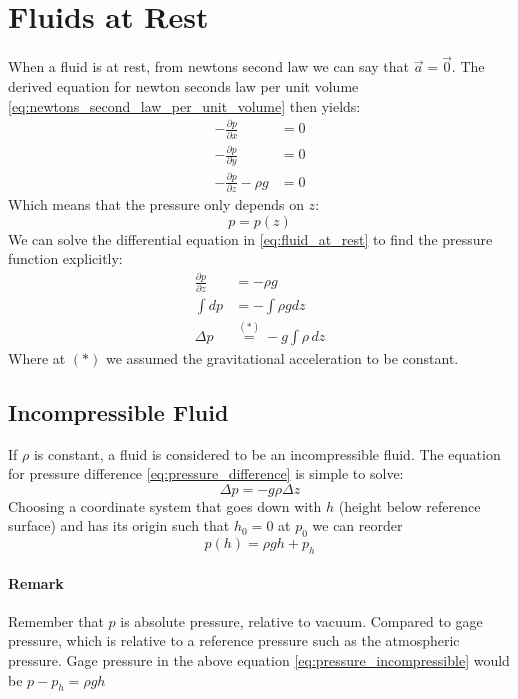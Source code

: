 \section{Fluids at Rest}
When a fluid is at rest, from newtons second law we can say that $\vec a = \vec 0$. The derived equation for newton seconds law per unit volume \eqref{eq:newtons_second_law_per_unit_volume} then yields:
\begin{equation}
	\begin{split}
		-\frac{\partial p}{\partial x} &= 0\\
		-\frac{\partial p}{\partial y} &= 0\\
		-\frac{\partial p}{\partial z}-\rho g &= 0
	\end{split}
	\label{eq:fluid_at_rest}
\end{equation}
Which means that the pressure only depends on $z$:
$$
p = p(z)
$$
We can solve the differential equation in \eqref{eq:fluid_at_rest} to find the pressure function explicitly:
\begin{equation}
	\begin{split}
		\frac{\partial p}{\partial z} &= -\rho g\\
		\int dp &= - \int \rho g dz\\
		\Delta p &\stackrel{(*)}{=} - g \int \rho\, dz
	\end{split}
	\label{eq:pressure_difference}
\end{equation}
Where at $(*)$ we assumed the gravitational acceleration to be constant.
\subsection{Incompressible Fluid}
If $\rho$ is constant, a fluid is considered to be an incompressible fluid. The equation for pressure difference \eqref{eq:pressure_difference} is simple to solve:
\begin{equation*}
	\Delta p = -g\rho \Delta z
\end{equation*}
Choosing a coordinate system that goes down with $h$ (height below reference surface) and has its origin such that $h_0=0$ at $p_0$ we can reorder
\begin{equation}
	\boxed{p(h)=\rho g h + p_h}
	\label{eq:pressure_incompressible}
\end{equation}
\paragraph{Remark}
Remember that $p$ is absolute pressure, relative to vacuum. Compared to gage pressure, which is relative to a reference pressure such as the atmospheric pressure. Gage pressure in the above equation \eqref{eq:pressure_incompressible} would be $p-p_h = \rho g h$

